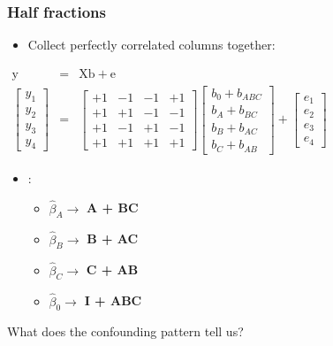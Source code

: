 \begin{frame}\frametitle{Half fractions}
	\begin{itemize}
		\item	Collect perfectly correlated columns together:
	\end{itemize}
	
	\vspace{12pt}
	$
	\begin{array}{rcl}
		\mathrm{y} &=& \mathrm{X} \mathrm{b} + \mathrm{e}\\
		\begin{bmatrix}
			y_1\\
			y_2\\
			y_3 \\
			y_4
		\end{bmatrix}
		&=&
		\begin{bmatrix}
			+1 & -1 & -1 & +1 \\
			+1 & +1 & -1 & -1 \\
			+1 & -1 & +1 & -1 \\
			+1 & +1 & +1 & +1
		\end{bmatrix}
		\begin{bmatrix}
			b_0 + b_{ABC} \\
			b_A + b_{BC} \\
			b_B + b_{AC} \\
			b_{C} + b_{AB}
		\end{bmatrix}
		+
		\begin{bmatrix}
			e_1\\
			e_2\\
			e_3 \\
			e_4
		\end{bmatrix}
	\end{array}
	$
	
	\vspace{12pt}
	\begin{itemize}
		\item	{\color{purple}{Confounding pattern}}:
		\begin{itemize}
			\item	$\widehat{\beta}_A \rightarrow$ \textbf{A + BC}
			\item	$\widehat{\beta}_B \rightarrow$ \textbf{B + AC}
			\item	$\widehat{\beta}_C \rightarrow$ \textbf{C + AB}
			\item	$\widehat{\beta}_0 \rightarrow$ \textbf{I + ABC}
		\end{itemize}
	\end{itemize}
	
	\vspace{12pt}
	What does the confounding pattern tell us?
\end{frame}

